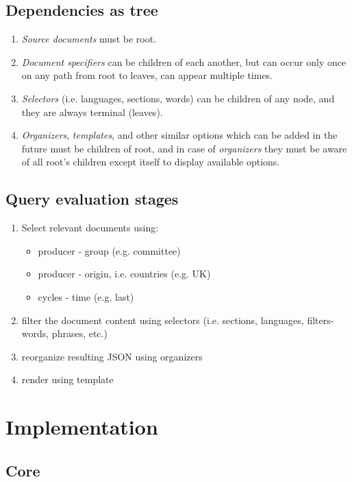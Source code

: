 \documentclass[11pt, a4paper]{report}
\begin{document}
\subsection{Dependencies as tree}
\begin{enumerate}
  \item \emph{Source documents} must be root.
  \item \emph{Document specifiers} can be children of each another, but can occur only once on any path from root to leaves, can appear multiple times.
  \item \emph{Selectors} (i.e. languages, sections, words) can be children of any node, and they are always terminal (leaves).
  \item \emph{Organizers}, \emph{templates}, and other similar options which can be added in the future must be children of root, and in case of \emph{organizers} they must be aware of all root's children except itself to display available options.
\end{enumerate}

\subsection{Query evaluation stages}
\begin{enumerate}
  \item Select relevant documents using:
  \begin{itemize}
    \item producer - group (e.g. committee)
    \item producer - origin, i.e. countries (e.g. UK)
    \item cycles - time (e.g. last)
  \end{itemize}
  \item filter the document content using selectors (i.e. sections, languages, filters- words, phrases, etc.)
  \item reorganize resulting JSON using organizers
  \item render using template
\end{enumerate}



\section{Implementation}
\subsection{Core}
\end{document}
